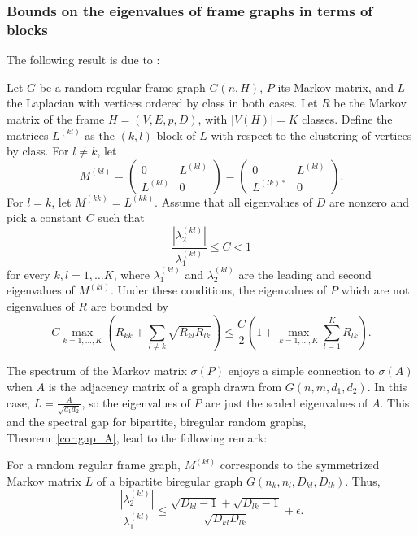 \subsubsection{Bounds on the eigenvalues of frame graphs in terms of blocks}

The following result is due to \citet*{wan2015}:
\begin{proposition}
\label{thm:spurious_eig_bound}
Let $G$ be a random regular frame graph $G(n,H)$,
$P$ its Markov matrix, 
and $L$ the Laplacian
with vertices ordered by class in both cases.
Let $R$ be the Markov matrix of the frame $H=(V,E,p,D)$, 
with $|V(H)| = K$ classes.
Define the matrices
$L^{(kl)}$
as the $(k,l)$ 
block of $L$ with respect to the clustering of vertices by class.
For $l \neq k$, let
\[
M^{(kl)} =
\left(
\begin{array}{cc} 
0 & L^{(kl)} \\
L^{(kl)} & 0 
\end{array}
\right) 
=
\left(
\begin{array}{cc} 
0 & L^{(kl)} \\
L^{(lk)*} & 0 
\end{array}
\right)
.
\]
For $l=k$, let $M^{(kk)} = L^{(kk)}$.
Assume that all eigenvalues of $D$ are nonzero and pick a constant $C$ such that
\[
	\frac{| \lambda_2^{(kl)} |}{\lambda_1^{(kl)}} \le C < 1
\]
for every $k,l = 1, \ldots K$, 
where $\lambda_1^{(kl)}$ and $\lambda_2^{(kl)}$ are the
leading and second eigenvalues of $M^{(kl)}$.
Under these conditions, the eigenvalues of $P$ which are not eigenvalues of $R$
are bounded by 
\[
C \max_{k=1,\ldots, K} \left( R_{kk} + \sum_{l \neq k} \sqrt{R_{kl} R_{lk}} \right)
\leq \frac{C}{2}  \left(1 + \max_{k=1,\ldots, K} \sum_{l=1}^K R_{lk} \right) .
\]
\end{proposition}


The spectrum of the Markov matrix $\sigma(P)$ enjoys a simple connection to $\sigma(A)$ 
when $A$ is the adjacency matrix of a graph drawn from $G(n,m,d_1,d_2)$.
In this case, $L = \frac{ A }{ \sqrt{d_1 d_2} }$, 
so the eigenvalues of $P$ are just the scaled eigenvalues of $A$.
This and the spectral gap for bipartite, biregular random graphs, 
Theorem~\ref{cor:gap_A},
lead to the following remark:

\begin{remark}
For a random regular frame graph, 
$M^{(kl)}$ corresponds to the symmetrized Markov matrix $L$ 
of a bipartite biregular graph 
$G(n_k, n_l, D_{kl}, D_{lk})$.
Thus,
\[
\frac{| \lambda_2^{(kl)} |}{\lambda_1^{(kl)}} 
\leq
\frac{\sqrt{D_{kl} - 1} +\sqrt{D_{lk} - 1}}{\sqrt{D_{kl} D_{lk}}} + \epsilon .
\]
\end{remark}

